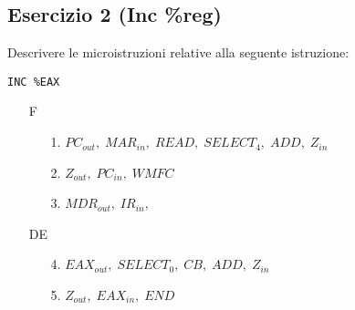\documentclass[a4paper]{article}
\theoremstyle{break}
\theoremstyle{break}
\theoremstyle{break}
\theoremstyle{break}
\begin{document}
\subsection{Esercizio 2 (Inc \%reg)}
\begin{exercise}
  Descrivere le microistruzioni relative alla seguente istruzione: 
  \begin{center}
    \texttt{INC \%EAX}
  \end{center}

  \begin{enumerate}
    \item [F]
      \begin{enumerate}
        \item [1.] \( PC_{out},\; MAR_{in},\; READ,\; SELECT_4,\; ADD,\; Z_{in} \) 
        \item [2.] \( Z_{out},\; PC_{in},\; WMFC \) 
        \item [3.] \( MDR_{out},\; IR_{in}, \) 
      \end{enumerate}

    \item [DE]
      \begin{enumerate}
        \item [4.] \( EAX_{out},\; SELECT_0,\; CB,\; ADD,\; Z_{in} \) 
        \item [5.] \( Z_{out},\; EAX_{in},\; END \) 
      \end{enumerate}
  \end{enumerate}
\end{exercise}
\end{document}
